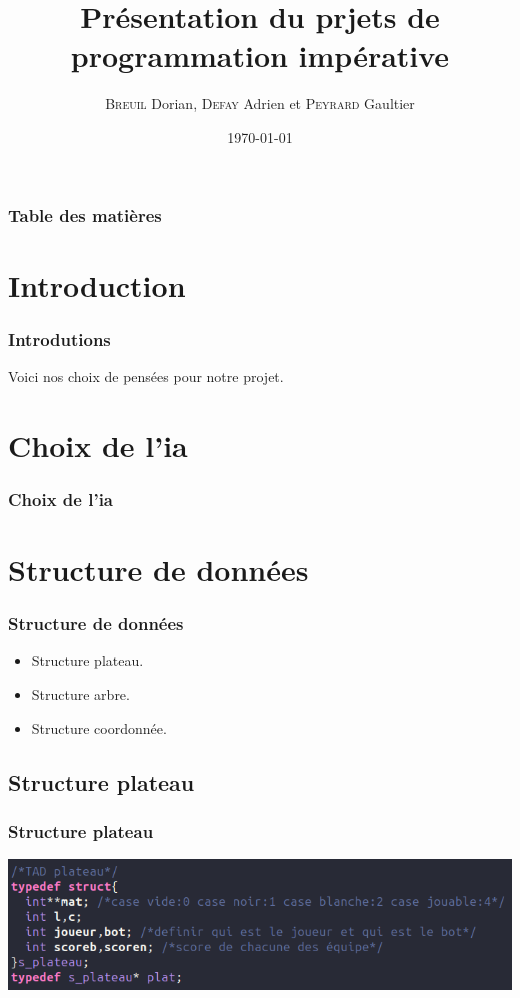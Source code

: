 \documentclass{beamer}
\title{Présentation du prjets de programmation impérative}
\author{\textsc{Breuil} Dorian, \textsc{Defay} Adrien et \textsc{Peyrard} Gaultier}
\date{\today}
\begin{document}
\frame{\titlepage}  %

\begin{frame}
  \frametitle{Table des matières}
  \tableofcontents
  
\end{frame}

\section{Introduction}
\begin{frame}
  \frametitle{Introdutions}  %
  Voici nos choix de pensées pour notre projet.
\end{frame}

\section{Choix de l'ia}
\begin{frame}
  \frametitle{Choix de l'ia}  %
  
\end{frame}

\section{Structure de données}
\begin{frame}
  \frametitle{Structure de données}
  \begin{itemize}
  \item Structure plateau.
  \item Structure arbre.
  \item Structure coordonnée.
  \end{itemize}
\end{frame}

\subsection{Structure plateau}
\begin{frame}
  \frametitle{Structure plateau}
  \includegraphics[scale=0.4]{fich/struct_plateau.png}
\end{frame}
\end{document}
